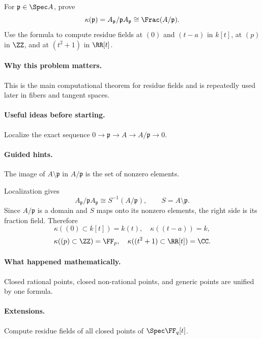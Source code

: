 \begin{problem}
For $\mathfrak p\in\Spec A$, prove
\[
\kappa(\mathfrak p)=A_{\mathfrak p}/\mathfrak pA_{\mathfrak p}
\cong\Frac(A/\mathfrak p).
\]
Use the formula to compute residue fields at $(0)$ and $(t-a)$ in $k[t]$, at $(p)$ in $\ZZ$, and at $(t^2+1)$ in $\RR[t]$.
\end{problem}

\paragraph{Why this problem matters.}
This is the main computational theorem for residue fields and is repeatedly used later in fibers and tangent spaces.

\paragraph{Useful ideas before starting.}
Localize the exact sequence $0\to\mathfrak p\to A\to A/\mathfrak p\to0$.

\paragraph{Guided hints.}
The image of $A\setminus\mathfrak p$ in $A/\mathfrak p$ is the set of nonzero elements.

\begin{solution}
Localization gives
\[
A_{\mathfrak p}/\mathfrak pA_{\mathfrak p}
\cong S^{-1}(A/\mathfrak p),\qquad S=A\setminus\mathfrak p.
\]
Since $A/\mathfrak p$ is a domain and $S$ maps onto its nonzero elements, the right side is its fraction field.  Therefore
\[
\kappa((0)\subset k[t])=k(t),\quad
\kappa((t-a))=k,
\]
\[
\kappa((p)\subset\ZZ)=\FF_p,
\quad
\kappa((t^2+1)\subset\RR[t])=\CC.
\]
\end{solution}

\paragraph{What happened mathematically.}
Closed rational points, closed non-rational points, and generic points are unified by one formula.

\paragraph{Extensions.}
Compute residue fields of all closed points of $\Spec\FF_q[t]$.
